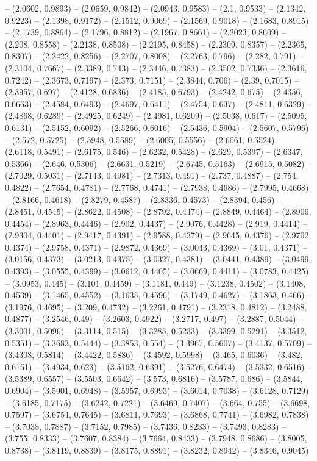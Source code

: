 -- (2.0602, 0.9893) -- (2.0659, 0.9842) -- (2.0943, 0.9583) -- (2.1, 0.9533) -- (2.1342, 0.9223) -- (2.1398, 0.9172) -- (2.1512, 0.9069) -- (2.1569, 0.9018) -- (2.1683, 0.8915) -- (2.1739, 0.8864) -- (2.1796, 0.8812) -- (2.1967, 0.8661) -- (2.2023, 0.8609) -- (2.208, 0.8558) -- (2.2138, 0.8508) -- (2.2195, 0.8458) -- (2.2309, 0.8357) -- (2.2365, 0.8307) -- (2.2422, 0.8256) -- (2.2707, 0.8008) -- (2.2763, 0.796) -- (2.282, 0.791) -- (2.3104, 0.7667) -- (2.3389, 0.743) -- (2.3446, 0.7383) -- (2.3502, 0.7336) -- (2.3616, 0.7242) -- (2.3673, 0.7197) -- (2.373, 0.7151) -- (2.3844, 0.706) -- (2.39, 0.7015) -- (2.3957, 0.697) -- (2.4128, 0.6836) -- (2.4185, 0.6793) -- (2.4242, 0.675) -- (2.4356, 0.6663) -- (2.4584, 0.6493) -- (2.4697, 0.6411) -- (2.4754, 0.637) -- (2.4811, 0.6329) -- (2.4868, 0.6289) -- (2.4925, 0.6249) -- (2.4981, 0.6209) -- (2.5038, 0.617) -- (2.5095, 0.6131) -- (2.5152, 0.6092) -- (2.5266, 0.6016) -- (2.5436, 0.5904) -- (2.5607, 0.5796) -- (2.572, 0.5725) -- (2.5948, 0.5589) -- (2.6005, 0.5556) -- (2.6061, 0.5524) -- (2.6118, 0.5491) -- (2.6175, 0.546) -- (2.6232, 0.5428) -- (2.629, 0.5397) -- (2.6347, 0.5366) -- (2.646, 0.5306) -- (2.6631, 0.5219) -- (2.6745, 0.5163) -- (2.6915, 0.5082) -- (2.7029, 0.5031) -- (2.7143, 0.4981) -- (2.7313, 0.491) -- (2.737, 0.4887) -- (2.754, 0.4822) -- (2.7654, 0.4781) -- (2.7768, 0.4741) -- (2.7938, 0.4686) -- (2.7995, 0.4668) -- (2.8166, 0.4618) -- (2.8279, 0.4587) -- (2.8336, 0.4573) -- (2.8394, 0.456) -- (2.8451, 0.4545) -- (2.8622, 0.4508) -- (2.8792, 0.4474) -- (2.8849, 0.4464) -- (2.8906, 0.4454) -- (2.8963, 0.4446) -- (2.902, 0.4437) -- (2.9076, 0.4428) -- (2.919, 0.4414) -- (2.9304, 0.4401) -- (2.9417, 0.4391) -- (2.9588, 0.4379) -- (2.9645, 0.4376) -- (2.9702, 0.4374) -- (2.9758, 0.4371) -- (2.9872, 0.4369) -- (3.0043, 0.4369) -- (3.01, 0.4371) -- (3.0156, 0.4373) -- (3.0213, 0.4375) -- (3.0327, 0.4381) -- (3.0441, 0.4389) -- (3.0499, 0.4393) -- (3.0555, 0.4399) -- (3.0612, 0.4405) -- (3.0669, 0.4411) -- (3.0783, 0.4425) -- (3.0953, 0.445) -- (3.101, 0.4459) -- (3.1181, 0.449) -- (3.1238, 0.4502) -- (3.1408, 0.4539) -- (3.1465, 0.4552) -- (3.1635, 0.4596) -- (3.1749, 0.4627) -- (3.1863, 0.466) -- (3.1976, 0.4695) -- (3.209, 0.4732) -- (3.2261, 0.4791) -- (3.2318, 0.4812) -- (3.2488, 0.4877) -- (3.2546, 0.49) -- (3.2603, 0.4922) -- (3.2717, 0.497) -- (3.2887, 0.5044) -- (3.3001, 0.5096) -- (3.3114, 0.515) -- (3.3285, 0.5233) -- (3.3399, 0.5291) -- (3.3512, 0.5351) -- (3.3683, 0.5444) -- (3.3853, 0.554) -- (3.3967, 0.5607) -- (3.4137, 0.5709) -- (3.4308, 0.5814) -- (3.4422, 0.5886) -- (3.4592, 0.5998) -- (3.465, 0.6036) -- (3.482, 0.6151) -- (3.4934, 0.623) -- (3.5162, 0.6391) -- (3.5276, 0.6474) -- (3.5332, 0.6516) -- (3.5389, 0.6557) -- (3.5503, 0.6642) -- (3.573, 0.6816) -- (3.5787, 0.686) -- (3.5844, 0.6904) -- (3.5901, 0.6948) -- (3.5957, 0.6993) -- (3.6014, 0.7038) -- (3.6128, 0.7129) -- (3.6185, 0.7175) -- (3.6242, 0.7221) -- (3.6469, 0.7407) -- (3.664, 0.755) -- (3.6698, 0.7597) -- (3.6754, 0.7645) -- (3.6811, 0.7693) -- (3.6868, 0.7741) -- (3.6982, 0.7838) -- (3.7038, 0.7887) -- (3.7152, 0.7985) -- (3.7436, 0.8233) -- (3.7493, 0.8283) -- (3.755, 0.8333) -- (3.7607, 0.8384) -- (3.7664, 0.8433) -- (3.7948, 0.8686) -- (3.8005, 0.8738) -- (3.8119, 0.8839) -- (3.8175, 0.8891) -- (3.8232, 0.8942) -- (3.8346, 0.9045) 